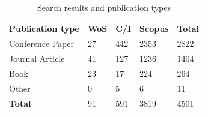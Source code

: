 \begin{table}[tb]
  \caption[Summary of search results in API documentation knowledge]{Search results and publication types}
  \label{tse2020:tab:search-results}
  \centering
  \begin{tabular}{l|lll|l}
    \toprule
    \textbf{Publication type} &
    \textbf{WoS} &
    \textbf{C/I} &
    \textbf{Scopus} &
    \textbf{Total} \\
    \midrule
    Conference Paper & 27 & 442 & 2353 & 2822 \\
    Journal Article & 41 & 127 & 1236 & 1404\\
    Book & 23 & 17 & 224 & 264\\
    Other & 0 & 5 & 6 & 11\\
    \midrule
    \textbf{Total} & 91 & 591 & 3819 & 4501\\
    \bottomrule
  \end{tabular}
\end{table}


